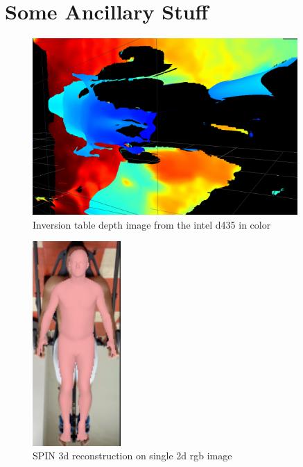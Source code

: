 
\chapter{Some Ancillary Stuff}

\begin{figure}[h]
        \caption{Inversion table depth image from the intel d435 in color}
        \centering
        \includegraphics[width=0.9\textwidth]{images/inversion_depth.png}
\end{figure}
 

\begin{figure}[h]
        \caption{SPIN 3d reconstruction on single 2d rgb image}
        \centering
        \includegraphics[width=0.3\textwidth]{images/spin.png}
\end{figure}





